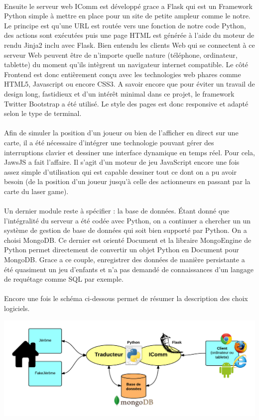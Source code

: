 \paragraph{}
Ensuite le serveur web IComm est développé grace a Flask qui est un Framework Python simple à mettre en place pour un site de petite ampleur comme le notre. Le principe est qu'une URL est routée vers une fonction de notre code Python, des actions sont exécutées puis une page HTML est générée à l'aide du moteur de rendu Jinja2 inclu avec Flask. Bien entendu les clients Web qui se connectent à ce serveur Web peuvent être de n'importe quelle nature (téléphone, ordinateur, tablette) du moment qu'ils intègrent un navigateur internet compatible. Le côté Frontend est donc entièrement conçu avec les technologies web phares comme HTML5, Javascript ou encore CSS3. A savoir encore que pour éviter un travail de design long, fastidieux et d'un intérêt minimal dans ce projet, le framework Twitter Bootstrap a été utilisé. Le style des pages est donc responsive et adapté selon le type de terminal.

\paragraph{}
Afin de simuler la position d'un joueur ou bien de l'afficher en direct sur une carte, il a été nécessaire d'intégrer une technologie pouvant gérer des interruptions clavier et dessiner une interface dynamique en temps réel. Pour cela, JawsJS a fait l'affaire. Il s'agit d'un moteur de jeu JavaScript encore une fois assez simple d'utilisation qui est capable dessiner tout ce dont on a pu avoir besoin (de la position d'un joueur jusqu'à celle des actionneurs en passant par la carte du laser game).

\paragraph{}
Un dernier module reste à spécifier : la base de données. Étant donné que l'intégralité du serveur a été codée avec Python, on a continuer a chercher un un système de gestion de base de données qui soit bien supporté par Python. On a choisi MongoDB. Ce dernier est orienté Document et la libraire MongoEngine de Python permet directement de convertir un objet Python en Document pour MongoDB. Grace a ce couple, enregistrer des données de manière persistante a été quasiment un jeu d'enfants et n'a pas demandé de connaissances d'un langage de requétage comme SQL par exemple.

\paragraph{}
Encore une fois le schéma ci-dessous permet de résumer la description des choix logiciels.

\includegraphics[scale=0.3]{image/architecture_logicielle}